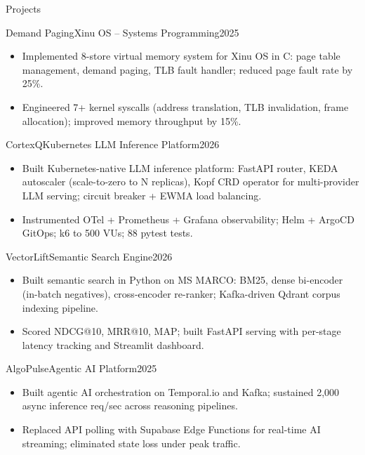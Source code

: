 \documentclass[]{mcdowellcv}
\begin{document}
\begin{cvsection}{Projects}
  \begin{cvsubsection}{Demand Paging}{Xinu OS -- Systems Programming}{2025}
    \begin{itemize}
      \item Implemented 8-store virtual memory system for Xinu OS in C: page table management, demand paging, TLB fault handler; reduced page fault rate by 25\%.
      \item Engineered 7+ kernel syscalls (address translation, TLB invalidation, frame allocation); improved memory throughput by 15\%.
    \end{itemize}
    \vspace{-1.5pt}
  \end{cvsubsection}

  \begin{cvsubsection}{CortexQ}{Kubernetes LLM Inference Platform}{2026}
    \begin{itemize}
      \item Built Kubernetes-native LLM inference platform: FastAPI router, KEDA autoscaler (scale-to-zero to N replicas), Kopf CRD operator for multi-provider LLM serving; circuit breaker + EWMA load balancing.
      \item Instrumented OTel + Prometheus + Grafana observability; Helm + ArgoCD GitOps; k6 to 500 VUs; 88 pytest tests.
    \end{itemize}
    \vspace{-1.5pt}
  \end{cvsubsection}

  \begin{cvsubsection}{VectorLift}{Semantic Search Engine}{2026}
    \begin{itemize}
      \item Built semantic search in Python on MS MARCO: BM25, dense bi-encoder (in-batch negatives), cross-encoder re-ranker; Kafka-driven Qdrant corpus indexing pipeline.
      \item Scored NDCG@10, MRR@10, MAP; built FastAPI serving with per-stage latency tracking and Streamlit dashboard.
    \end{itemize}
    \vspace{-1.5pt}
  \end{cvsubsection}

  \begin{cvsubsection}{AlgoPulse}{Agentic AI Platform}{2025}
    \begin{itemize}
      \item Built agentic AI orchestration on Temporal.io and Kafka; sustained 2,000 async inference req/sec across reasoning pipelines.
      \item Replaced API polling with Supabase Edge Functions for real-time AI streaming; eliminated state loss under peak traffic.
    \end{itemize}
  \end{cvsubsection}
\end{cvsection}
\end{document}

